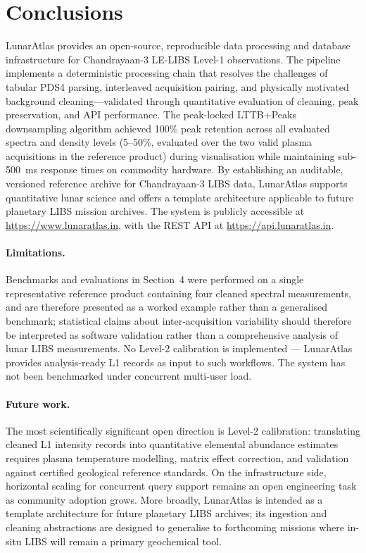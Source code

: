 \documentclass[final,5p,twocolumn,a4paper]{elsarticle}
\begin{document}
\section{Conclusions}

LunarAtlas provides an open-source, reproducible data processing and database infrastructure for Chandrayaan-3 LE-LIBS Level-1 observations. The pipeline implements a deterministic processing chain that resolves the challenges of tabular PDS4 parsing, interleaved acquisition pairing, and physically motivated background cleaning---validated through quantitative evaluation of cleaning, peak preservation, and API performance. The peak-locked LTTB+Peaks downsampling algorithm achieved 100\% peak retention across all evaluated spectra and density levels (5--50\%, evaluated over the two valid plasma acquisitions in the reference product) during visualisation while maintaining sub-500~ms response times on commodity hardware. By establishing an auditable, versioned reference archive for Chandrayaan-3 LIBS data, LunarAtlas supports quantitative lunar science and offers a template architecture applicable to future planetary LIBS mission archives. The system is publicly accessible at \url{https://www.lunaratlas.in}, with the REST API at \url{https://api.lunaratlas.in}.

\paragraph{Limitations.} Benchmarks and evaluations in Section~4 were performed on a single representative reference product containing four cleaned spectral measurements, and are therefore presented as a worked example rather than a generalised benchmark; statistical claims about inter-acquisition variability should therefore be interpreted as software validation rather than a comprehensive analysis of lunar LIBS measurements. No Level-2 calibration is implemented --- LunarAtlas provides analysis-ready L1 records as input to such workflows. The system has not been benchmarked under concurrent multi-user load.

\paragraph{Future work.} The most scientifically significant open direction is Level-2 calibration: translating cleaned L1 intensity records into quantitative elemental abundance estimates requires plasma temperature modelling, matrix effect correction, and validation against certified geological reference standards. On the infrastructure side, horizontal scaling for concurrent query support remains an open engineering task as community adoption grows. More broadly, LunarAtlas is intended as a template architecture for future planetary LIBS archives; its ingestion and cleaning abstractions are designed to generalise to forthcoming missions where in-situ LIBS will remain a primary geochemical tool.
\end{document}
